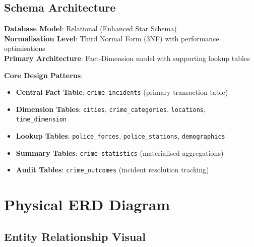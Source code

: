 \documentclass[12pt,a4paper]{article}
\begin{document}
\subsection{Schema Architecture}

\textbf{Database Model}: Relational (Enhanced Star Schema)\\
\textbf{Normalisation Level}: Third Normal Form (3NF) with performance optimisations\\
\textbf{Primary Architecture}: Fact-Dimension model with supporting lookup tables

\textbf{Core Design Patterns}:
\begin{itemize}
    \item \textbf{Central Fact Table}: \texttt{crime\_incidents} (primary transaction table)
    \item \textbf{Dimension Tables}: \texttt{cities}, \texttt{crime\_categories}, \texttt{locations}, \texttt{time\_dimension}
    \item \textbf{Lookup Tables}: \texttt{police\_forces}, \texttt{police\_stations}, \texttt{demographics}
    \item \textbf{Summary Tables}: \texttt{crime\_statistics} (materialised aggregations)
    \item \textbf{Audit Tables}: \texttt{crime\_outcomes} (incident resolution tracking)
\end{itemize}

\section{Physical ERD Diagram}

\subsection{Entity Relationship Visual}
\end{document}
